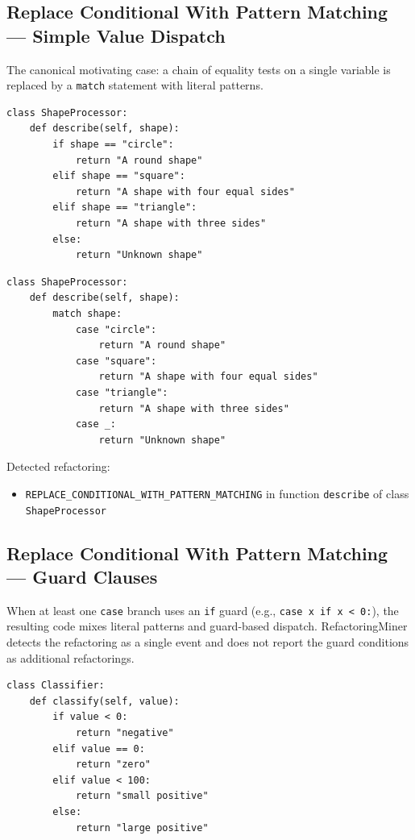 \documentclass[11pt,a4paper]{article}
\newcommand{\code}[1]{\texttt{#1}}
\begin{document}
\subsection{Replace Conditional With Pattern Matching --- Simple Value Dispatch}

The canonical motivating case: a chain of equality tests on a single variable is replaced by a \code{match} statement with literal patterns.

\begin{lstlisting}[caption={Before: \texttt{if}/\texttt{elif}/\texttt{else} chain on a string variable.}]
class ShapeProcessor:
    def describe(self, shape):
        if shape == "circle":
            return "A round shape"
        elif shape == "square":
            return "A shape with four equal sides"
        elif shape == "triangle":
            return "A shape with three sides"
        else:
            return "Unknown shape"
\end{lstlisting}

\begin{lstlisting}[caption={After: \texttt{match}/\texttt{case} with literal patterns.}]
class ShapeProcessor:
    def describe(self, shape):
        match shape:
            case "circle":
                return "A round shape"
            case "square":
                return "A shape with four equal sides"
            case "triangle":
                return "A shape with three sides"
            case _:
                return "Unknown shape"
\end{lstlisting}

Detected refactoring:
\begin{itemize}[leftmargin=*]
  \item \code{REPLACE\_CONDITIONAL\_WITH\_PATTERN\_MATCHING} in function \code{describe} of class \code{ShapeProcessor}
\end{itemize}

\subsection{Replace Conditional With Pattern Matching --- Guard Clauses}

When at least one \code{case} branch uses an \code{if} guard (e.g., \code{case x if x < 0:}), the resulting code mixes literal patterns and guard-based dispatch. RefactoringMiner detects the refactoring as a single event and does not report the guard conditions as additional refactorings.

\begin{lstlisting}[caption={Before: range checks in an \texttt{if}/\texttt{elif}/\texttt{else} chain.}]
class Classifier:
    def classify(self, value):
        if value < 0:
            return "negative"
        elif value == 0:
            return "zero"
        elif value < 100:
            return "small positive"
        else:
            return "large positive"
\end{lstlisting}
\end{document}
